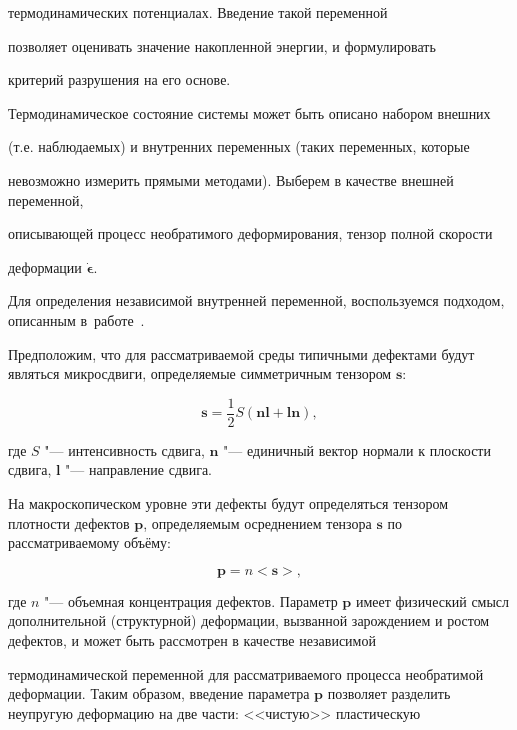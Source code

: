 термодинамических потенциалах. Введение такой переменной

позволяет оценивать значение накопленной энергии, и формулировать

критерий разрушения на его основе.



\smallskip




Термодинамическое состояние системы может быть описано набором внешних

(т.е. наблюдаемых) и внутренних переменных (таких переменных, которые

невозможно измерить прямыми методами). Выберем в качестве внешней переменной,

описывающей процесс необратимого деформирования, тензор полной скорости

деформации $\boldsymbol{\dot{\epsilon}}$.

Для определения независимой внутренней переменной, воспользуемся подходом, описанным в~работе~\cite{kostina:bib:Betekh}.



Предположим, что для рассматриваемой среды типичными дефектами будут являться микросдвиги, определяемые симметричным тензором $\boldsymbol{s}$:

$$

\boldsymbol{s}=\frac{1}{2}S(\boldsymbol{n}\boldsymbol{l}+\boldsymbol{l}\boldsymbol{n}),

$$

где $S$ "---  интенсивность сдвига, $\boldsymbol{n}$ "---  единичный вектор нормали к плоскости сдвига, $\boldsymbol{l}$ "---  направление сдвига.

На макроскопическом уровне эти дефекты будут определяться тензором плотности дефектов  $\boldsymbol{p}$, определяемым осреднением тензора $\boldsymbol{s}$ по рассматриваемому объёму:

$$

\boldsymbol{p}=n<\boldsymbol{s}>,

$$

где  $n$ "--- объемная концентрация дефектов. Параметр $\boldsymbol{p}$  имеет физический смысл дополнительной (структурной) деформации, вызванной зарождением и ростом дефектов, и может быть рассмотрен в качестве независимой

термодинамической переменной для рассматриваемого процесса необратимой деформации. Таким образом, введение параметра $\boldsymbol{p}$  позволяет разделить неупругую деформацию на две части: <<чистую>> пластическую

